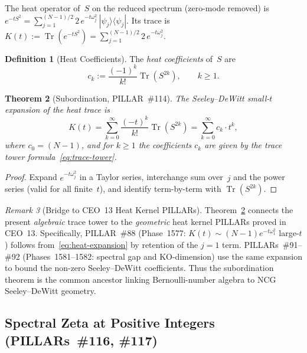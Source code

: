 \documentclass[aps,prd,twocolumn,superscriptaddress,floatfix,nofootinbib]{revtex4-2}
\newtheorem{theorem}{Theorem}
\theoremstyle{definition}
\newtheorem{definition}[theorem]{Definition}
\theoremstyle{remark}
\newtheorem{remark}[theorem]{Remark}
\begin{document}
The heat operator of~$S$ on the reduced spectrum (zero-mode removed) is
$e^{-tS^2} = \sum_{j=1}^{(N-1)/2} 2\,e^{-t\omega_j^2}\,|\psi_j\rangle\langle\psi_j|$.
Its trace is $K(t) := \operatorname{Tr}(e^{-tS^2}) = \sum_{j=1}^{(N-1)/2} 2\,e^{-t\omega_j^2}$.

\begin{definition}[Heat Coefficients]
The \emph{heat coefficients} of~$S$ are
\begin{equation}
  c_k := \frac{(-1)^k}{k!}\operatorname{Tr}(S^{2k}),
  \qquad k \ge 1.
  \label{eq:heat-coeffs}
\end{equation}
\end{definition}

\begin{theorem}[Subordination, PILLAR~\#114]
\label{thm:subordination}
The Seeley--DeWitt small-$t$ expansion of the heat trace is
\begin{equation}
  K(t)
  = \sum_{k=0}^{\infty} \frac{(-t)^k}{k!}\operatorname{Tr}(S^{2k})
  = \sum_{k=0}^{\infty} c_k \cdot t^k,
  \label{eq:heat-expansion}
\end{equation}
where $c_0 = (N-1)$, and for $k \ge 1$ the coefficients $c_k$ are given
by the trace tower formula~\eqref{eq:trace-tower}.
\end{theorem}

\begin{proof}
Expand $e^{-t\omega_j^2}$ in a Taylor series, interchange sum over~$j$ and
the power series (valid for all finite~$t$), and identify term-by-term with
$\operatorname{Tr}(S^{2k})$.
\end{proof}

\begin{remark}[Bridge to CEO~13 Heat Kernel PILLARs]
Theorem~\ref{thm:subordination} connects the present \emph{algebraic} trace
tower to the \emph{geometric} heat kernel PILLARs proved in CEO~13.
Specifically, PILLAR~\#88 (Phase~1577: $K(t)\sim(N-1)e^{-t\omega_1^2}$ large-$t$)
follows from~\eqref{eq:heat-expansion} by retention of the $j=1$ term.
PILLARs~\#91--\#92 (Phases~1581--1582: spectral gap and KO-dimension) use the
same expansion to bound the non-zero Seeley--DeWitt coefficients.
Thus the subordination theorem is the common ancestor linking Bernoulli-number
algebra to NCG Seeley--DeWitt geometry.
\end{remark}

\subsection{Spectral Zeta at Positive Integers (PILLARs~\#116, \#117)}
\label{sec:spectral-zeta-positive}
\end{document}
